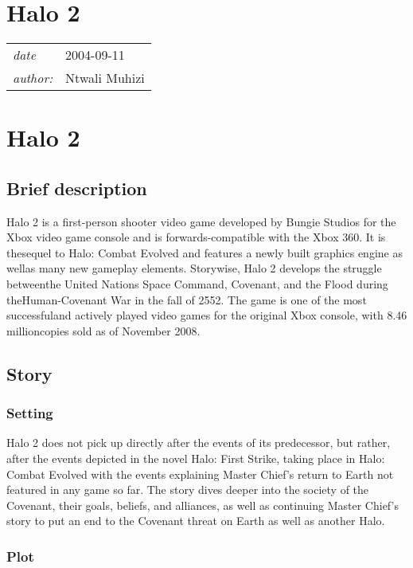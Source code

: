 \documentclass[a4paper,10pt]{book}
\newcommand{\pageHeader}[4]{
    \section{#1}
    \vspace{-0.3cm}
    \begin{table}[h!]
     \begin{tabular}{ll}
        \hline
        \textit{date} & #2 \\
        \textit{author: } & #3\\
        \hline
     \end{tabular}
    \end{table}
    \vspace{-0.3cm}
}
\begin{document}
 \newpage\pageHeader{Halo 2}{2004-09-11}{Ntwali Muhizi}{Third  and arguably the best iteration of the halo franchise.. yes third}
 \section{ Halo 2 }
 \subsection{Brief description }
 
          Halo 2 is a first-person shooter video game developed by Bungie Studios for the Xbox video game console and is forwards-compatible with the Xbox 360. 
          It is thesequel to Halo:  Combat Evolved and features a newly built graphics engine as wellas many new gameplay elements. 
          Storywise, Halo 2 develops the struggle betweenthe United Nations Space Command, Covenant, and the Flood during theHuman-Covenant War in the fall of 2552. 
          The game is one of the most successfuland actively played video games for the original Xbox console, with 8.46 millioncopies sold as of November 2008.
         
 
 \subsection{Story }
 
 \subsubsection{Setting }
 
          Halo 2 does not pick up directly after the events of its predecessor, but rather, after the events depicted in the novel Halo: First Strike, taking place in Halo:
          Combat Evolved with the events explaining Master Chief's return to Earth not featured in any game so far. The story dives deeper into the society of the Covenant,
          their goals, beliefs, and alliances, as well as continuing Master Chief's story to put an end to the Covenant threat on Earth as well as another Halo. 
         
 
 \subsubsection{Plot }
 
\end{document}
